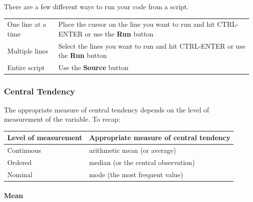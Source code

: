 \documentclass[]{article}
\let\oldparagraph\paragraph
\renewcommand{\paragraph}[1]{\oldparagraph{#1}\mbox{}}
\theoremstyle{definition}
\theoremstyle{definition}
\theoremstyle{definition}
\theoremstyle{remark}
\begin{document}
There are a few different ways to run your code from a script.

\begin{longtable}[]{@{}ll@{}}
\toprule
\begin{minipage}[t]{0.24\columnwidth}\raggedright\strut
One line at a time\strut
\end{minipage} & \begin{minipage}[t]{0.70\columnwidth}\raggedright\strut
Place the cursor on the line you want to run and hit CTRL-ENTER or use
the \textbf{Run} button\strut
\end{minipage}\tabularnewline
\begin{minipage}[t]{0.24\columnwidth}\raggedright\strut
Multiple lines\strut
\end{minipage} & \begin{minipage}[t]{0.70\columnwidth}\raggedright\strut
Select the lines you want to run and hit CTRL-ENTER or use the
\textbf{Run} button\strut
\end{minipage}\tabularnewline
\begin{minipage}[t]{0.24\columnwidth}\raggedright\strut
Entire script\strut
\end{minipage} & \begin{minipage}[t]{0.70\columnwidth}\raggedright\strut
Use the \textbf{Source} button\strut
\end{minipage}\tabularnewline
\bottomrule
\end{longtable}

\subsubsection{Central Tendency}\label{central-tendency}

The appropriate measure of central tendency depends on the level of
measurement of the variable. To recap:

\begin{longtable}[]{@{}ll@{}}
\toprule
Level of measurement & Appropriate measure of central
tendency\tabularnewline
\midrule
\endhead
Continuous & arithmetic mean (or average)\tabularnewline
Ordered & median (or the central observation)\tabularnewline
Nominal & mode (the most frequent value)\tabularnewline
\bottomrule
\end{longtable}

\paragraph{Mean}\label{mean}
\end{document}
